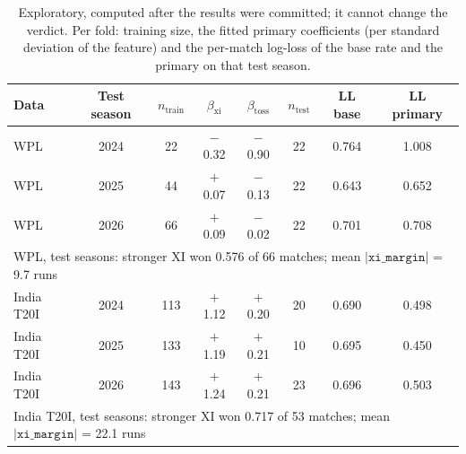 \begin{table}[t]\centering\small
\caption{Exploratory, computed after the results were committed; it cannot change the verdict. Per fold: training size, the fitted primary coefficients (per standard deviation of the feature) and the per-match log-loss of the base rate and the primary on that test season.}\label{tab:folds}
\begin{tabular}{lccccccc}\toprule
Data & Test season & $n_{\text{train}}$ & $\beta_{\text{xi}}$ & $\beta_{\text{toss}}$ & $n_{\text{test}}$ & LL base & LL primary\\\midrule
WPL & 2024 & 22 & $-$0.32 & $-$0.90 & 22 & 0.764 & 1.008\\
WPL & 2025 & 44 & $+$0.07 & $-$0.13 & 22 & 0.643 & 0.652\\
WPL & 2026 & 66 & $+$0.09 & $-$0.02 & 22 & 0.701 & 0.708\\
\multicolumn{8}{l}{\quad WPL, test seasons: stronger XI won 0.576 of 66 matches; mean $|\texttt{xi\_margin}|$ = 9.7 runs}\\\midrule
India T20I & 2024 & 113 & $+$1.12 & $+$0.20 & 20 & 0.690 & 0.498\\
India T20I & 2025 & 133 & $+$1.19 & $+$0.21 & 10 & 0.695 & 0.450\\
India T20I & 2026 & 143 & $+$1.24 & $+$0.21 & 23 & 0.696 & 0.503\\
\multicolumn{8}{l}{\quad India T20I, test seasons: stronger XI won 0.717 of 53 matches; mean $|\texttt{xi\_margin}|$ = 22.1 runs}\\
\bottomrule\end{tabular}
\end{table}
